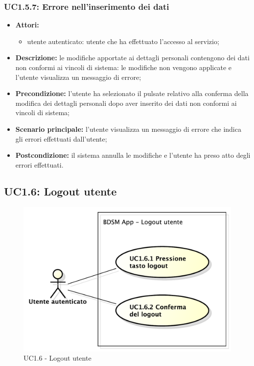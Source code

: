 \subsubsection{UC1.5.7:  Errore nell'inserimento dei dati}
\begin{itemize}
	\item \textbf{Attori:}
	\begin{itemize}
		\item utente autenticato: utente che ha effettuato l'accesso al servizio;
	\end{itemize}
	\item \textbf{Descrizione:} le modifiche apportate ai dettagli personali contengono dei dati non conformi ai vincoli di sistema: le modifiche non vengono applicate e l'utente visualizza un messaggio di errore;
	\item \textbf{Precondizione:} l'utente ha selezionato il pulsate relativo alla conferma della modifica dei dettagli personali dopo aver inserito dei dati non conformi ai vincoli di sistema;
	\item \textbf{Scenario principale:} l'utente visualizza un messaggio di errore che indica gli errori effettuati dall'utente;
	\item \textbf{Postcondizione:} il sistema annulla le modifiche e l'utente ha preso atto degli errori effettuati.
\end{itemize}


\pagebreak


\subsection{UC1.6: Logout utente}
\begin{figure}[htbp]
	\centering
	\centerline{\includegraphics[scale=0.45]{./images/UC1_6.pdf}}
	\caption{UC1.6 - Logout utente}
\end{figure}

